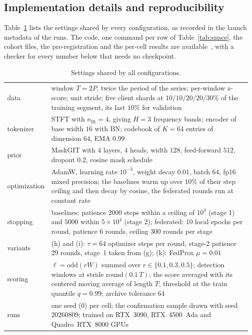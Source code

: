 \documentclass[conference]{IEEEtran}
\begin{document}
\subsection{Implementation details and reproducibility}
\label{subsec:repro}

Table~\ref{tab:hparams} lists the settings shared by every configuration, as recorded in the launch
metadata of the runs. The code, one command per row of Table~\ref{tab:space}, the cohort files, the
pre-registration and the per-cell results are available~\cite{schiavo2026fedtimevqvae}, with a
checker for every number below that needs no checkpoint.

\begin{table}[t]
\caption{Settings shared by all configurations.}
\label{tab:hparams}
\centering
\scriptsize
\setlength{\tabcolsep}{2.2pt}
\renewcommand{\arraystretch}{1.0}
\begin{tabular}{@{}l p{6.95cm}@{}}
\hline
data & window $T=2P$, twice the period of the series; per-window z-score; unit stride; five client shards at $10/10/20/20/30\%$ of the training segment, its last $10\%$ for validation \\
tokenizer & STFT with $n_\mathrm{fft}=4$, giving $H=3$ frequency bands; encoder of base width $16$ with BN; codebook of $K=64$ entries of dimension $64$, EMA $0.99$ \\
prior & MaskGIT with $4$ layers, $4$ heads, width $128$, feed-forward $512$, dropout $0.2$, cosine mask schedule \\
optimization & AdamW, learning rate $10^{-3}$, weight decay $0.01$, batch $64$, fp16 mixed precision; the baselines warm up over $10\%$ of their step ceiling and then decay by cosine, the federated rounds run at constant rate \\
stopping & baselines: patience $2000$ steps within a ceiling of $10^4$ (stage 1) and $5000$ within $5\times10^4$ (stage 2); federated: $10$ local epochs per round, patience $6$ rounds, ceiling $300$ rounds per stage \\
variants & (h) and (i): $\tau=64$ optimizer steps per round, stage-2 patience $29$ rounds, stage~1 taken from (g); (k): FedProx $\mu=0.01$ \\
scoring & $\ell=\mathrm{odd}(rW)$ summed over $r\in\{0.1,0.3,0.5\}$; detection windows at stride $\mathrm{round}(0.1\,T)$; the score averaged with its centered moving average of length $T$; threshold at the train quantile $q=0.99$; archive tolerance $64$ \\
runs & one seed ($0$) per cell; the confirmation sample drawn with seed $20260809$; trained on RTX~3090, RTX~4500~Ada and Quadro~RTX~8000 GPUs \\
\hline
\end{tabular}
\end{table}
\end{document}
